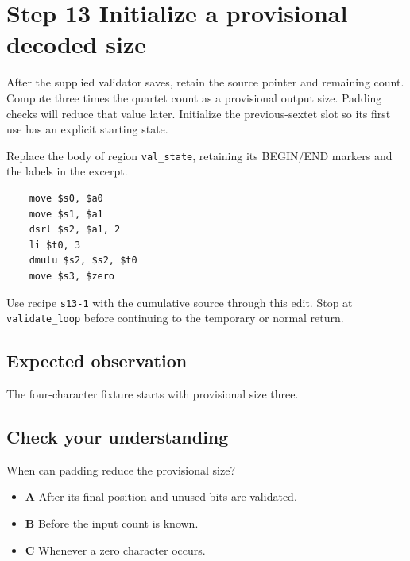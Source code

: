 \section{Step 13 Initialize a provisional decoded size}\label{base64-s13}

After the supplied validator saves, retain the source pointer and remaining count. Compute three times the quartet count as a provisional output size. Padding checks will reduce that value later. Initialize the previous-sextet slot so its first use has an explicit starting state.

Replace the body of region \texttt{val\_state}, retaining its BEGIN/END markers and the labels in the excerpt.

\begin{verbatim}
    move $s0, $a0
    move $s1, $a1
    dsrl $s2, $a1, 2
    li $t0, 3
    dmulu $s2, $s2, $t0
    move $s3, $zero
\end{verbatim}

Use recipe \texttt{s13-1} with the cumulative source through this edit. Stop at \texttt{validate\_loop} before continuing to the temporary or normal return.

\subsection{Expected observation}
The four-character fixture starts with provisional size three.

\subsection{Check your understanding}
When can padding reduce the provisional size?

\begin{itemize}
  \item \textbf{A} After its final position and unused bits are validated.
  \item \textbf{B} Before the input count is known.
  \item \textbf{C} Whenever a zero character occurs.
\end{itemize}
